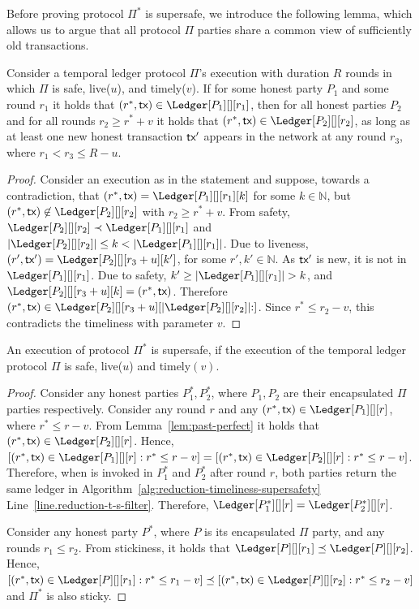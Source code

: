Before proving protocol $\Pi^*$ is supersafe, we introduce
the following lemma, which allows us to argue that all
protocol $\Pi$ parties share a common view of sufficiently old transactions.

\begin{lemma}\label{lem:past-perfect}
  Consider a temporal ledger protocol $\Pi$'s
  execution with duration $R$ rounds in which $\Pi$ is
  safe, live($u$), and timely($v$).
  If for some honest party $P_1$ and some round $r_1$ it holds that
  $(r^*, \tx) \in \Ledger[P_1][][r_1]$, then
  for all honest parties $P_2$ and for all rounds $r_2 \geq r^* + v$
  it holds that $(r^*, \tx) \in \Ledger[P_2][][r_2]$,
  as long as at least one new honest transaction $\textsf{tx}'$ appears in the
  network at any round $r_3$, where $r_1 < r_3 \leq R - u$.
\end{lemma}
\begin{proof}
  Consider an execution as in the statement and suppose, towards a contradiction,
  that $(r^*, \tx) = \Ledger[P_1][][r_1][k]$ for some $k \in \mathbb{N}$,
  but $(r^*, \tx) \not\in \Ledger[P_2][][r_2]$
  with $r_2 \geq r^* + v$.
  From safety,
  $\Ledger[P_2][][r_2] \prec \Ledger[P_1][][r_1]$ and
  $|\Ledger[P_2][][r_2]| \leq k < |\Ledger[P_1][][r_1]|$.
  Due to liveness, $(r', \tx') = \Ledger[P_2][][r_3 + u][k']$,
  for some $r', k' \in \mathbb{N}$.
  As $\textsf{tx}'$ is new, it is not in $\Ledger[P_1][][r_1]$.
  Due to safety, $k' \geq |\Ledger[P_1][][r_1]| > k$, and
  $\Ledger[P_2][][r_3 + u][k] = (r^*, \tx)$.
  Therefore
  $(r^*, \tx) \in \Ledger[P_2][][r_3 + u][|\Ledger[P_2][][r_2]|{:}]$.
  Since $r^* \leq r_2 - v$, this contradicts the timeliness with parameter $v$.\Qed
\end{proof}

\begin{theorem}
  An execution of protocol $\Pi^*$ is supersafe, if the execution of the
  temporal ledger protocol $\Pi$ is safe, live($u$) and timely$(v)$.
\end{theorem}
\begin{proof}
  Consider any honest parties $P_1^*,P_2^*$, where
  $P_1,P_2$ are their encapsulated $\Pi$ parties respectively.
  Consider any round $r$ and any
  $(r^*, \tx) \in \Ledger[P_1][][r]$, where $r^* \leq r - v$.
  From Lemma~\ref{lem:past-perfect} it holds that
  $(r^*, \tx) \in \Ledger[P_2][][r]$. Hence, 
  $[(r^*, \tx) \in \Ledger[P_1][][r]: r^* \leq r - v] = [(r^*, \tx) \in \Ledger[P_2][][r]: r^* \leq r - v]$.
  Therefore, when \rread is invoked in $P_1^*$ and $P_2^*$ after round $r$, both
  parties return the same ledger in Algorithm~\ref{alg:reduction-timeliness-supersafety}
  Line~\ref{line.reduction-t-s-filter}. Therefore, $\Ledger[P_1^*][][r] = \Ledger[P_2^*][][r]$.

  Consider any honest party $P^*$, where $P$ is its encapsulated $\Pi$ party,
  and any rounds $r_1 \leq r_2$.
  From stickiness, it holds that $\Ledger[P][][r_1] \preceq \Ledger[P][][r_2]$.
  Hence, $[(r^*, \tx) \in \Ledger[P][][r_1]: r^* \leq r_1 - v] \preceq [(r^*, \tx) \in \Ledger[P][][r_2]: r^* \leq r_2 - v]$
  and $\Pi^*$ is also sticky.
\end{proof}

